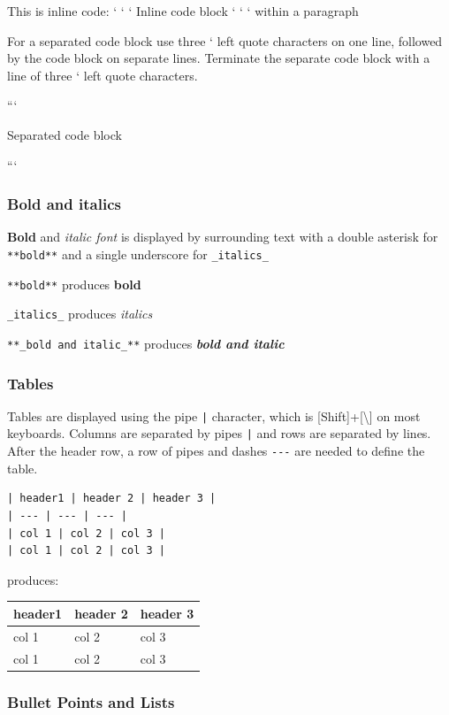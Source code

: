 \documentclass{book}
\begin{document}
This is inline code: ` ` ` Inline code block ` ` ` within a paragraph

For a separated code block use three ` left quote characters on one
line, followed by the code block on separate lines. Terminate the
separate code block with a line of three ` left quote characters.

```

Separated code block

```

\subsubsection{Bold and italics}\label{bold-and-italics}

\textbf{Bold} and \emph{italic font} is displayed by surrounding text
with a double asterisk for \lstinline!**bold**! and a single underscore
for \lstinline!_italics_!

\lstinline!**bold**! produces \textbf{bold}

\lstinline!_italics_! produces \emph{italics}

\lstinline!**_bold and italic_**! produces \textbf{\emph{bold and
italic}}

\subsubsection{Tables}\label{tables}

Tables are displayed using the pipe \lstinline!|! character, which is
{[}Shift{]}+{[}\textbackslash{}{]} on most keyboards. Columns are
separated by pipes \lstinline!|! and rows are separated by lines. After
the header row, a row of pipes and dashes \lstinline!---! are needed to
define the table.

\begin{lstlisting}
| header1 | header 2 | header 3 |
| --- | --- | --- |
| col 1 | col 2 | col 3 |
| col 1 | col 2 | col 3 |
\end{lstlisting}

produces:

\begin{longtable}[]{@{}lll@{}}
\toprule
header1 & header 2 & header 3\tabularnewline
\midrule
\endhead
col 1 & col 2 & col 3\tabularnewline
col 1 & col 2 & col 3\tabularnewline
\bottomrule
\end{longtable}

\subsubsection{Bullet Points and Lists}\label{bullet-points-and-lists}
\end{document}
